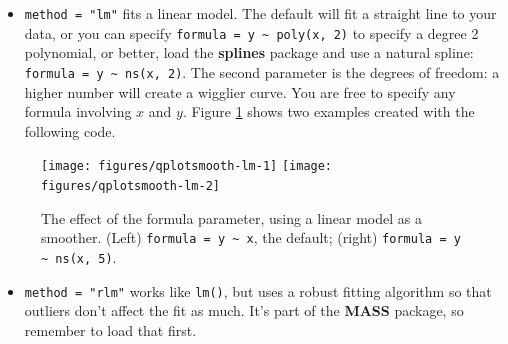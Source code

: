 \begin{itemize}
\itemsep1pt\parskip0pt
\item
  \texttt{method = "lm"} fits a linear model. The default will fit a
  straight line to your data, or you can specify
  \texttt{formula = y \textasciitilde{} poly(x, 2)} to specify a degree
  2 polynomial, or better, load the \textbf{splines} package and use a
  natural spline: \texttt{formula = y \textasciitilde{} ns(x, 2)}. The
  second parameter is the degrees of freedom: a higher number will
  create a wigglier curve. You are free to specify any formula involving
  \(x\) and \(y\). Figure \ref{fig:smooth-lm} shows two examples created
  with the following code. 
\end{itemize}

\begin{Shaded}
\begin{Highlighting}[]
  \NormalTok{(}\NormalTok{, }\NormalTok{), }
   \NormalTok{)}
  \NormalTok{(}\NormalTok{, }\NormalTok{), }
   \NormalTok{, } \StringTok{ }\NormalTok{))}
\end{Highlighting}
\end{Shaded}

\begin{figure}

{\centering \texttt{[image: figures/qplotsmooth-lm-1]} \texttt{[image: figures/qplotsmooth-lm-2]} 

}

\caption{The effect of the formula parameter, using a linear model as a smoother.  (Left) \texttt{formula = y \textasciitilde{} x}, the default; (right) \texttt{formula = y \textasciitilde{} ns(x, 5)}.\label{fig:smooth-lm}}
\end{figure}

\begin{itemize}
\itemsep1pt\parskip0pt
\item
  \texttt{method = "rlm"} works like \texttt{lm()}, but uses a robust
  fitting algorithm so that outliers don't affect the fit as much. It's
  part of the \textbf{MASS} package, so remember to load that first.
   
\end{itemize}

